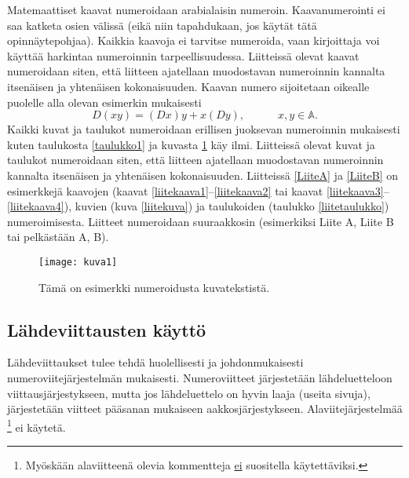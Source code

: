 \documentclass[english,12pt,a4paper,dvips]{article}
\begin{document}
Matemaattiset kaavat numeroidaan arabialaisin
numeroin. Kaavanumerointi ei saa katketa osien välissä (eikä niin
tapahdukaan, jos käytät tätä opinnäytepohjaa). Kaikkia kaavoja ei tarvitse
numeroida, vaan kirjoittaja voi käyttää harkintaa numeroinnin
tarpeellisuudessa.  Liitteissä olevat kaavat numeroidaan siten, että
liitteen ajatellaan muodostavan numeroinnin kannalta itsenäisen ja
yhtenäisen kokonaisuuden. Kaavan numero sijoitetaan oikealle puolelle
alla olevan esimerkin mukaisesti
\begin{equation}
D(xy) = (Dx)y + x(Dy),  \hspace{3em} x,y \in \mathbb{A}.
\end{equation}
Kaikki kuvat ja taulukot numeroidaan erillisen juoksevan numeroinnin
mukaisesti kuten taulukosta \ref{taulukko1} ja kuvasta \ref{kuva1} käy
ilmi.  Liitteissä olevat kuvat ja taulukot numeroidaan siten, että
liitteen ajatellaan muodostavan numeroinnin kannalta itsenäisen ja
yhtenäisen kokonaisuuden. Liitteissä \ref{LiiteA} ja \ref{LiiteB} on
esimerkkejä kaavojen (kaavat \ref{liitekaava1}--\ref{liitekaava2} tai
kaavat \ref{liitekaava3}--\ref{liitekaava4}), kuvien (kuva
\ref{liitekuva}) ja taulukoiden (taulukko \ref{liitetaulukko})
numeroimisesta.  Liitteet numeroidaan suuraakkosin (esimerkiksi Liite
A, Liite B tai pelkästään A, B).
\begin{figure}[htb]
\centering \texttt{[image: kuva1]}
\caption{Tämä on esimerkki numeroidusta kuvatekstistä. \label{kuva1}}
\end{figure}

\subsection*{Lähdeviittausten käyttö} 

Lähdeviittaukset tulee tehdä huolellisesti ja johdonmukaisesti
numeroviitejärjestelmän mukaisesti. Numeroviitteet järjestetään
lähdeluetteloon viittausjärjestykseen, mutta jos lähdeluettelo
on hyvin laaja (useita sivuja), järjestetään viitteet pääsanan 
mukaiseen aakkosjärjestykseen. Alaviitejärjestelmää
\footnote{Myöskään alaviitteenä olevia kommentteja \underline{ei} suositella
käytettäviksi.} ei käytetä. 
\end{document}
